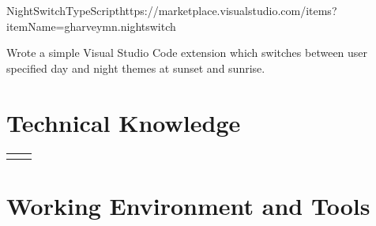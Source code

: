 \documentclass[
  9pt, %
]{FreemanCV}
\begin{document}
\begin{paracol}{2}
\begin{project}{NightSwitch}{TypeScript}{https://marketplace.visualstudio.com/items?itemName=gharveymn.nightswitch}
  \item Wrote a simple Visual Studio Code extension which switches between user specified
        day and night themes at sunset and sunrise.
\end{project}

\medskip %


\switchcolumn %

\section{Technical Knowledge}




\begin{supertabular}{r l} %








\end{supertabular}

\section{Working Environment and Tools}


\end{paracol}
\end{document}
